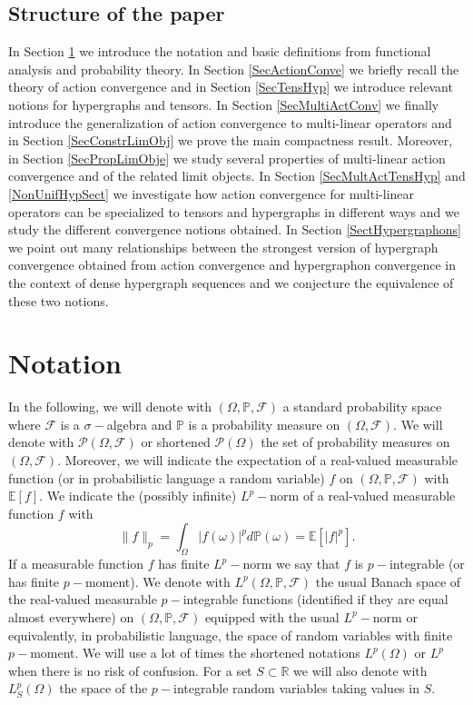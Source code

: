 \documentclass[11pt]{article}
\def\R{\mathbb{R}}
\def\P{\mathbb{P}}
\def\E{\mathbb{E}}
\begin{document}
\subsection*{Structure of the paper}

In Section \ref{SecNotation} we introduce the notation and basic definitions from functional analysis and probability theory. In Section \ref{SecActionConve} we briefly recall the theory of action convergence and in Section \ref{SecTensHyp} we introduce relevant notions for hypergraphs and tensors. In Section \ref{SecMultiActConv} we finally introduce the generalization of  action convergence to multi-linear operators and in Section \ref{SecConstrLimObj} we prove the main compactness result. Moreover, in Section \ref{SecPropLimObje} we study several properties of multi-linear action convergence and of the related limit objects. In Section \ref{SecMultActTensHyp} and \ref{NonUnifHypSect} we investigate how action convergence for multi-linear operators can be specialized to tensors and hypergraphs in different ways and we study the different convergence notions obtained. In Section \ref{SectHypergraphons} we point out many relationships between the strongest version of hypergraph convergence obtained from action convergence and hypergraphon convergence in the context of dense hypergraph sequences and we conjecture the equivalence of these two notions.  

\section{Notation}\label{SecNotation}

In the following, we will denote with $(\Omega,\P,\mathcal{F})$ a standard probability space where $\mathcal{F}$ is a  $\sigma-$algebra and $\P$ is a probability measure on $(\Omega,\mathcal{F})$. We will denote with $\mathcal{P}(\Omega,\mathcal{F})$ or shortened $\mathcal{P}(\Omega)$ the set of probability measures on $(\Omega,\mathcal{F})$. Moreover, we will indicate the expectation of a real-valued measurable function (or in probabilistic language a random variable) $f$ on $(\Omega,\P,\mathcal{F})$ with $\E[f]$. We indicate the (possibly infinite) $L^p-$norm of a real-valued measurable function $f$ with  
$$
\|f\|_p=\int_{\Omega}|f(\omega)|^pd\P(\omega)=\E[|f|^p].
$$ If a measurable function $f$ has finite $L^p-$norm we say that $f$ is $p-$integrable (or has finite $p-$moment). We denote with $L^p(\Omega,\P,\mathcal{F})$ the usual Banach space of the real-valued measurable $p-$integrable functions (identified if they are equal almost everywhere) on $(\Omega,\P,\mathcal{F})$ equipped with the usual $L^p-$norm or equivalently, in probabilistic language, the space of random variables with finite $p-$moment. We will use a lot of times the shortened notations $L^p(\Omega)$ or $L^p$ when there is no risk of confusion. For a set $S\subset \R$ we will also denote with $L_S^p(\Omega)$ the space of the $p-$integrable random variables taking values in $S$.\newline 
\end{document}
